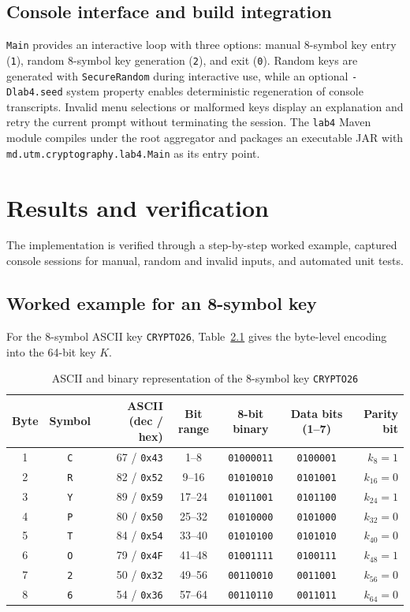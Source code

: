 \documentclass{utmreport}
\begin{document}
\section{Console interface and build integration}
\texttt{Main} provides an interactive loop with three options: manual 8-symbol key entry (\texttt{1}), random 8-symbol key generation (\texttt{2}), and exit (\texttt{0}). Random keys are generated with \texttt{SecureRandom} during interactive use, while an optional \texttt{-Dlab4.seed} system property enables deterministic regeneration of console transcripts. Invalid menu selections or malformed keys display an explanation and retry the current prompt without terminating the session. The \texttt{lab4} Maven module compiles under the root aggregator and packages an executable JAR with \texttt{md.utm.cryptography.lab4.Main} as its entry point.

\chapter{Results and verification}
The implementation is verified through a step-by-step worked example, captured console sessions for manual, random and invalid inputs, and automated unit tests.

\section{Worked example for an 8-symbol key}
For the 8-symbol ASCII key \texttt{CRYPTO26}, Table~\ref{tab:ascii} gives the byte-level encoding into the 64-bit key $K$.
\begin{table}[!htbp]
\caption{ASCII and binary representation of the 8-symbol key \texttt{CRYPTO26}}
\label{tab:ascii}\centering
\begin{tabular}{ccrcccr}\hline
Byte & Symbol & ASCII (dec / hex) & Bit range & 8-bit binary & Data bits (1--7) & Parity bit\\\hline
1 & \texttt{C} & 67 / \texttt{0x43} & 1--8   & \texttt{01000011} & \texttt{0100001} & $k_{8}=1$\\
2 & \texttt{R} & 82 / \texttt{0x52} & 9--16  & \texttt{01010010} & \texttt{0101001} & $k_{16}=0$\\
3 & \texttt{Y} & 89 / \texttt{0x59} & 17--24 & \texttt{01011001} & \texttt{0101100} & $k_{24}=1$\\
4 & \texttt{P} & 80 / \texttt{0x50} & 25--32 & \texttt{01010000} & \texttt{0101000} & $k_{32}=0$\\
5 & \texttt{T} & 84 / \texttt{0x54} & 33--40 & \texttt{01010100} & \texttt{0101010} & $k_{40}=0$\\
6 & \texttt{O} & 79 / \texttt{0x4F} & 41--48 & \texttt{01001111} & \texttt{0100111} & $k_{48}=1$\\
7 & \texttt{2} & 50 / \texttt{0x32} & 49--56 & \texttt{00110010} & \texttt{0011001} & $k_{56}=0$\\
8 & \texttt{6} & 54 / \texttt{0x36} & 57--64 & \texttt{00110110} & \texttt{0011011} & $k_{64}=0$\\\hline
\end{tabular}
\end{table}
\end{document}
